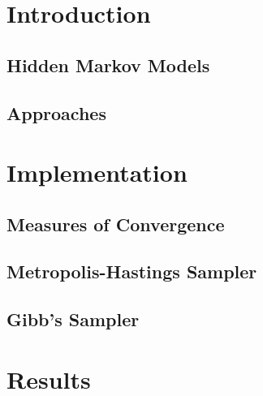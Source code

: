 
\chapter{Introduction}
	\section{Hidden Markov Models}
		
		
	\section{Approaches}
		

\chapter{Implementation}
	
	\section{Measures of Convergence}
		
		
	\section{Metropolis-Hastings Sampler}
		
	\section{Gibb's Sampler}
		

\chapter{Results}
	
	
	